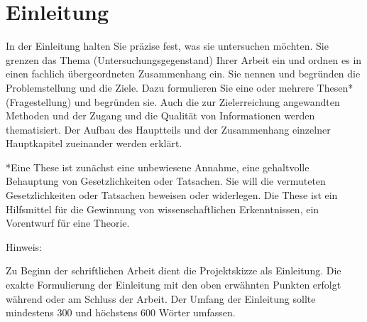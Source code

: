 \part{Einleitung}
In der Einleitung halten Sie präzise fest, was sie untersuchen möchten. Sie grenzen das Thema (Untersuchungsgegenstand) Ihrer Arbeit ein und ordnen es in einen fachlich übergeordneten Zusammenhang ein. 
Sie nennen und begründen die Problemstellung und die Ziele. Dazu formulieren Sie eine oder mehrere Thesen* (Fragestellung) und begründen sie. Auch die zur Zielerreichung angewandten Methoden und der Zugang und die Qualität von Informationen werden thematisiert. Der Aufbau des Hauptteils und der Zusammenhang einzelner Hauptkapitel zueinander werden erklärt.

*Eine These ist zunächst eine unbewiesene Annahme, eine gehaltvolle Behauptung von Gesetzlichkeiten oder Tatsachen. Sie will die vermuteten Gesetzlichkeiten oder Tatsachen beweisen oder widerlegen. Die These ist ein Hilfsmittel für die Gewinnung von wissenschaftlichen Erkenntnissen, ein Vorentwurf für eine Theorie. 

Hinweis: 

Zu Beginn der schriftlichen Arbeit dient die Projektskizze als Einleitung. Die exakte Formulierung der Einleitung mit den oben erwähnten Punkten erfolgt während oder am Schluss der Arbeit. Der Umfang der Einleitung sollte mindestens 300 und höchstens 600 Wörter umfassen.
